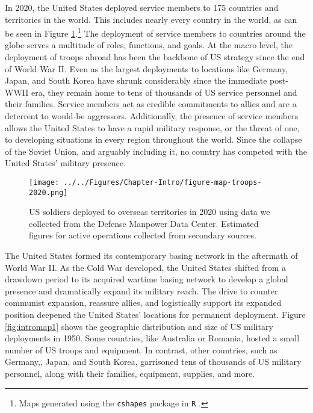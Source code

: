 In 2020, the United States deployed service members to 175 countries and territories in the world.\autocite{DMDC2020} This includes nearly every country in the world, as can be seen in Figure \ref{fig:intromap2}.\footnote{Maps generated using the {\tt cshapes} package in {\tt R} \autocite[see:][]{weidmannetal2010}.}  The deployment of service members to countries around the globe serves a multitude of roles, functions, and goals. At the macro level, the deployment of troops abroad has been the backbone of US strategy since the end of World War II. Even as the largest deployments to locations like Germany, Japan, and South Korea have shrunk considerably since the immediate post-WWII era, they remain home to tens of thousands of US service personnel and their families. Service members act as credible commitments to allies and are a deterrent to would-be aggressors.\autocite{Schelling1966} Additionally, the presence of service members allows the United States to have a rapid military response, or the threat of one, to developing situations in every region throughout the world.  Since the collapse of the Soviet Union, and arguably including it, no country has competed with the United States' military presence.

\begin{figure}[t]
	\centering\texttt{[image: ../../Figures/Chapter-Intro/figure-map-troops-2020.png]}
	\caption{US soldiers deployed to overseas territories in 2020 using data we collected from the Defense Manpower Data Center.\autocite{DMDC2020} Estimated figures for active operations collected from secondary sources.}
	\label{fig:intromap2}
\end{figure}



The United States formed its contemporary basing network in the aftermath of World War II. As the Cold War developed, the United States shifted from a drawdown period to its acquired wartime basing network to develop a global presence and dramatically expand its military reach. The drive to counter communist expansion, reassure allies, and logistically support its expanded position deepened the United States' locations for permanent deployment.\autocite{Huston1988} Figure \ref{fig:intromap1} shows the geographic distribution and size of US military deployments in 1950. Some countries, like Australia or Romania, hosted a small number of US troops and equipment. In contrast, other countries, such as Germany,, Japan, and South Korea, garrisoned tens of thousands of US military personnel, along with their families, equipment, supplies, and more. 


